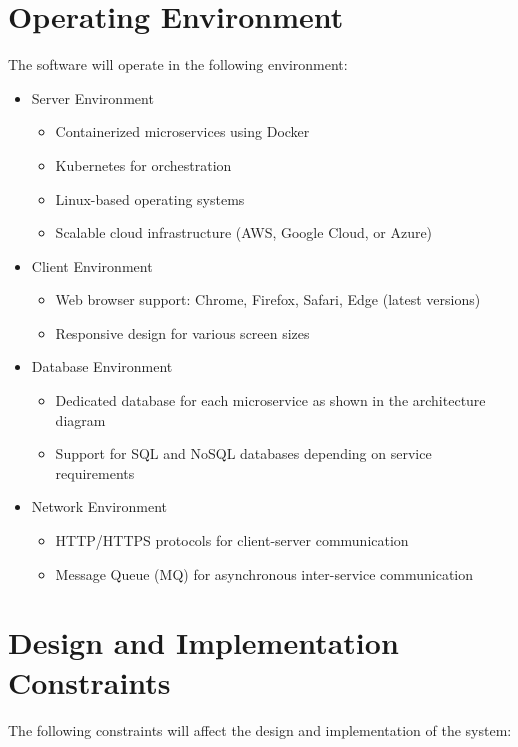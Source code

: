 \documentclass[oneside,a4paper,12pt,explicit]{book}
\begin{document}
\section{Operating Environment}
The software will operate in the following environment:

\begin{itemize}
    \item Server Environment
    \begin{itemize}
        \item Containerized microservices using Docker
        \item Kubernetes for orchestration
        \item Linux-based operating systems
        \item Scalable cloud infrastructure (AWS, Google Cloud, or Azure)
    \end{itemize}
    
    \item Client Environment
    \begin{itemize}
        \item Web browser support: Chrome, Firefox, Safari, Edge (latest versions)
        \item Responsive design for various screen sizes
    \end{itemize}
    
    \item Database Environment
    \begin{itemize}
        \item Dedicated database for each microservice as shown in the architecture diagram
        \item Support for SQL and NoSQL databases depending on service requirements
    \end{itemize}
    
    \item Network Environment
    \begin{itemize}
        \item HTTP/HTTPS protocols for client-server communication
        \item Message Queue (MQ) for asynchronous inter-service communication
    \end{itemize}
\end{itemize}

\section{Design and Implementation Constraints}
The following constraints will affect the design and implementation of the system:
\end{document}
